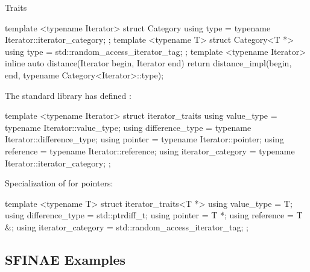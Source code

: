 \begin{frame}[fragile]{Traits}
    \begin{cpp}
template <typename Iterator>
struct Category {
  using type = typename Iterator::iterator_category;
};
template <typename T>
struct Category<T *> {
  using type = std::random_access_iterator_tag;
};
template <typename Iterator>
inline auto distance(Iterator begin, Iterator end) {
  return distance_impl(begin, end,
                    typename Category<Iterator>::type{});
}
    \end{cpp}
\end{frame}

\begin{frame}[fragile]{}
    The standard library has defined :
    \begin{cpp}
template <typename Iterator>
struct iterator_traits {
  using value_type = typename Iterator::value_type;
  using difference_type
      = typename Iterator::difference_type;
  using pointer = typename Iterator::pointer;
  using reference = typename Iterator::reference;
  using iterator_category
      = typename Iterator::iterator_category;
};
    \end{cpp}
\end{frame}

\begin{frame}[fragile]{}
    Specialization of  for pointers:
    \begin{cpp}
template <typename T>
struct iterator_traits<T *> {
  using value_type = T;
  using difference_type = std::ptrdiff_t;
  using pointer = T *;
  using reference = T &;
  using iterator_category
      = std::random_access_iterator_tag;
};
    \end{cpp}
\end{frame}

\subsection{SFINAE Examples}

